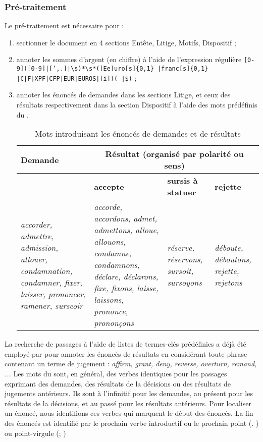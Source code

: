 \subsubsection{Pré-traitement}

Le pré-traitement est nécessaire pour :
\begin{enumerate}
	\item sectionner le document en 4 sections Entête, Litige, Motifs, Dispositif ;
	\item annoter les sommes d'argent (en chiffre) à l'aide de l'expression régulière \og \texttt{[0-9]([0-9]|[',.]|\textbackslash s)*\textbackslash s*([Ee]uro[s]\{0,1\} |franc[s]\{0,1\} \\ |\euro|F|XPF|CFP|EUR|EUROS|[i])( |\$)}\fg{} ;
	\item annoter les énoncés de demandes dans les sections Litige, et ceux des résultats respectivement dans la section Dispositif à l'aide des mots prédéfinis du .
	 
	\begin{table}[!htb]		
		\footnotesize
		\begin{center}
		\begin{tabular}{|p{}|p{}|p{}|p{}|}
			\hline
			\textbf{Demande} & \multicolumn{3}{c|}{\textbf{Résultat} (organisé par polarité ou sens)} \\ \hline
			& \textbf{accepte} &\textbf{sursis à statuer} & \textbf{rejette} \\ \hline
			\textit{accorder, admettre, admission, allouer, condamnation, condamner, fixer, laisser, prononcer, ramener, surseoir} & \textit{accorde, accordons, admet, admettons, alloue, allouons, condamne, condamnons, déclare, déclarons, fixe, fixons, laisse, laissons, prononce, prononçons} & \textit{réserve, réservons, sursoit, sursoyons} & \textit{déboute, déboutons, rejette, rejetons} \\ \hline
		\end{tabular}						
	\end{center}
		\caption{Mots introduisant les énoncés de demandes et de résultats}\label{tab:quanta:mots-introductifs}
	\end{table}
\end{enumerate} 

La recherche de passages à l'aide de listes de termes-clés prédéfinies a déjà été employé par \citet{wyner2010extractlegalelts} pour annoter les énoncés de résultats en considérant toute phrase contenant un terme de jugement : \textit{affirm, grant, deny, reverse, overturn, remand, ...} Les mots du  sont, en général, des verbes identiques pour les passages exprimant des demandes, des résultats de la décisions ou des résultats de jugements antérieurs. Ils sont à l'infinitif pour les demandes, au présent pour les résultats de la décisions, et au passé pour les résultats antérieurs. Pour localiser un énoncé, nous identifions ces verbes qui marquent le début des énoncés. La fin des énoncés est identifié par le prochain verbe introductif ou le prochain point (\og . \fg{}) ou point-virgule (\og ; \fg{})

